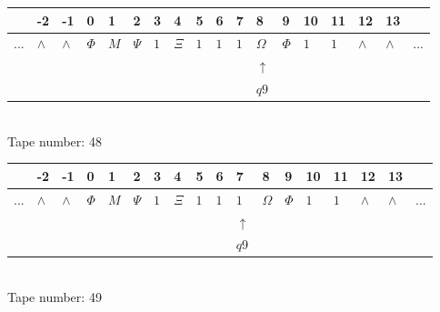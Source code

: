 \documentclass[11pt]{article}
\begin{document}
\begin{table}[H]
\centering
\begin{tabular}{llllllllllllllllll}
 & -2 & -1 & 0 & 1 & 2 & 3 & 4 & 5 & 6 & 7 & 8 & 9 & 10 & 11 & 12 & 13 & \\
\hline
$...$ & \multicolumn{1}{|l|}{$\wedge$} & \multicolumn{1}{|l|}{$\wedge$} & \multicolumn{1}{|l|}{$\Phi$} & \multicolumn{1}{|l|}{$M$} & \multicolumn{1}{|l|}{$\Psi$} & \multicolumn{1}{|l|}{$1$} & \multicolumn{1}{|l|}{$\Xi$} & \multicolumn{1}{|l|}{$1$} & \multicolumn{1}{|l|}{$1$} & \multicolumn{1}{|l|}{$1$} & \multicolumn{1}{|l|}{$\Omega$} & \multicolumn{1}{|l|}{$\Phi$} & \multicolumn{1}{|l|}{$1$} & \multicolumn{1}{|l|}{$1$} & \multicolumn{1}{|l|}{$\wedge$} & \multicolumn{1}{|l|}{$\wedge$} & $...$\\
\hline
&  &  &  &  &  &  &  &  &  &  & $\uparrow$ &  &  &  &  &  &  \\
&  &  &  &  &  &  &  &  &  &  & $ q9 $ &  &  &  &  &  &  \\
\end{tabular}
\\
Tape number: 48
\noindent\makebox[\linewidth]{\hdashrule{\textwidth}{1pt}{1pt}}\end{table}

\begin{table}[H]
\centering
\begin{tabular}{llllllllllllllllll}
 & -2 & -1 & 0 & 1 & 2 & 3 & 4 & 5 & 6 & 7 & 8 & 9 & 10 & 11 & 12 & 13 & \\
\hline
$...$ & \multicolumn{1}{|l|}{$\wedge$} & \multicolumn{1}{|l|}{$\wedge$} & \multicolumn{1}{|l|}{$\Phi$} & \multicolumn{1}{|l|}{$M$} & \multicolumn{1}{|l|}{$\Psi$} & \multicolumn{1}{|l|}{$1$} & \multicolumn{1}{|l|}{$\Xi$} & \multicolumn{1}{|l|}{$1$} & \multicolumn{1}{|l|}{$1$} & \multicolumn{1}{|l|}{$1$} & \multicolumn{1}{|l|}{$\Omega$} & \multicolumn{1}{|l|}{$\Phi$} & \multicolumn{1}{|l|}{$1$} & \multicolumn{1}{|l|}{$1$} & \multicolumn{1}{|l|}{$\wedge$} & \multicolumn{1}{|l|}{$\wedge$} & $...$\\
\hline
&  &  &  &  &  &  &  &  &  & $\uparrow$ &  &  &  &  &  &  &  \\
&  &  &  &  &  &  &  &  &  & $ q9 $ &  &  &  &  &  &  &  \\
\end{tabular}
\\
Tape number: 49
\noindent\makebox[\linewidth]{\hdashrule{\textwidth}{1pt}{1pt}}\end{table}
\end{document}
